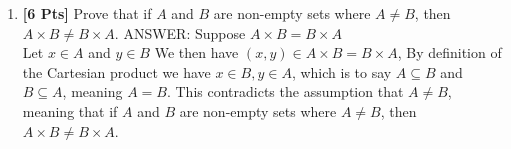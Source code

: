 \documentclass[12pt]{article}
\begin{document}
\begin{enumerate}
\item {\bf [6 Pts]} Prove that if $A$ and $B$ are non-empty sets where $A \neq B$, then $A \times B \neq B \times A$.\linebreak \linebreak
       ANSWER: Suppose $A \times B = B \times A$\\
       Let $x \in A$ and $y \in B$ We then have $(x,y) \in A \times B = B \times A$, By definition of the Cartesian product we have $x \in B, y \in A$, which is to say $A \subseteq B$ and $B \subseteq A$, meaning $A=B$. This contradicts the assumption that $A \neq B$, meaning that if $A$ and $B$ are non-empty sets where $A \neq B$, then $A \times B \neq B \times A$.

\end{enumerate}
\end{document}
